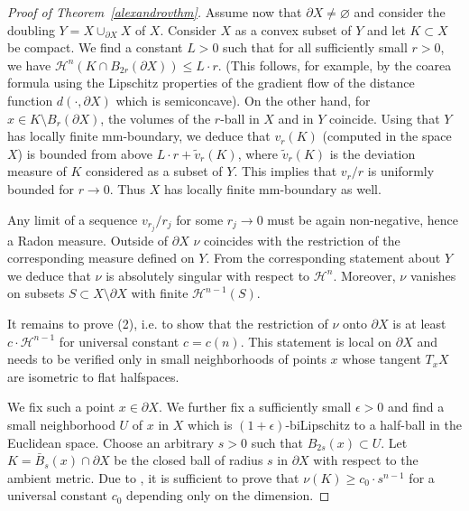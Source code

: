 \documentclass[12pt,leqno]{amsart}
\numberwithin{equation}{section}
\theoremstyle{definition}
\theoremstyle{remark}
\newcommand{\vol}{\mathrm{vol}}
\def\emptyset{\varnothing}
\begin{document}
\begin{proof}[Proof of Theorem~\ref{alexandrovthm}]

Assume now that $\partial X\ne\emptyset$ and consider the doubling $Y=X\cup _{\partial X} X$ of $X$. Consider $X$ as a convex subset of $Y$ and let $K\subset X$ be compact.  We find a constant $L>0$ such that for all sufficiently small $r>0$, we have  $\mathcal H^n (K\cap B_{2r} (\partial X)) \leq L \cdot r$. (This follows, for example, by the coarea formula using the Lipschitz properties of the gradient flow of the distance function $d(\cdot, \partial X)$ which is semiconcave).   On the other hand, for $x\in K\setminus B_r (\partial X)$, the volumes of the $r$-ball in $X$ and in $Y$ coincide.  Using that $Y$ has locally finite mm-boundary, we deduce that $v_r(K)$  (computed in the space $X$) is bounded from above  $L\cdot r + \tilde v_r (K)$, where $\tilde v_r (K)$ is the deviation measure of $K$ considered as a subset of $Y$.  This implies that $v_r /r$ is uniformly bounded for $r\to 0$.    Thus $X$ has locally finite mm-boundary as well.

Any limit of a sequence $v_{r_j} /r_j$ for some $r_j\to 0$ must be  again non-negative, hence a Radon measure.  Outside of $\partial X$
   $\nu$ coincides  with the restriction of the corresponding measure defined on $Y$.   From the corresponding statement about  $Y$ we deduce that  $\nu$ is absolutely singular with respect to $\mathcal H^n$. Moreover, $\nu$ vanishes on subsets $S\subset X\setminus \partial X$ with finite $\mathcal H^{n-1}  (S)$.

   It remains to prove (2), i.e. to show that  the restriction of $\nu$ onto $\partial X$ is at least
   $c\cdot \mathcal H^{n-1}$ for  universal constant $c=c(n)$. This statement is local on $\partial X$ and needs to be verified only in small neighborhoods of points $x$  whose tangent $T_xX$
   are isometric to flat halfspaces.

	We fix such a point $x\in \partial X$. We further fix a sufficiently small $\epsilon >0$ and find
	a small neighborhood $U$ of $x$ in $X$ which is
   $(1+\epsilon)$-biLipschitz to a half-ball in the Euclidean space.  Choose an arbitrary $s>0$ such that $B_{2s} (x)\subset U$.
	Let $K= \bar B_s (x) \cap \partial X$ be the closed ball of radius $s$ in $\partial X$  with respect to the ambient metric.  Due to \cite[Section 1.6]{Evans},
	 it is sufficient to prove that $\nu (K) \geq  c_0 \cdot s^{n-1}$  for a universal constant $c_0$ depending only on the dimension.
	

\end{proof}
\end{document}
